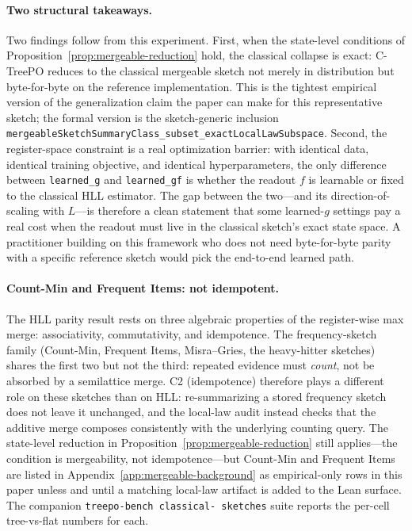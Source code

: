 \paragraph{Two structural takeaways.}
Two findings follow from this experiment. First, when the state-level
conditions of Proposition~\ref{prop:mergeable-reduction} hold, the
classical collapse is exact: C-TreePO reduces to the classical
mergeable sketch not merely in distribution but byte-for-byte on the
reference implementation. This is the tightest empirical version of
the generalization claim the paper can make for this representative
sketch; the formal version is the sketch-generic inclusion
\texttt{mergeableSketchSummaryClass\_subset\_exactLocalLawSubspace}.
Second, the register-space constraint is a real optimization barrier:
with identical data, identical training objective, and identical
hyperparameters, the only difference between \texttt{learned\_g} and
\texttt{learned\_gf} is whether the readout $f$ is learnable or fixed
to the classical HLL estimator. The gap between the two---and its
direction-of-scaling with $L$---is therefore a clean statement that
some learned-$g$ settings pay a real cost when the readout must live
in the classical sketch's exact state space. A practitioner building
on this framework who does not need byte-for-byte parity with a
specific reference sketch would pick the end-to-end learned path.

\paragraph{Count-Min and Frequent Items: not idempotent.}
The HLL parity result rests on three algebraic properties of the
register-wise max merge: associativity, commutativity, and
idempotence. The frequency-sketch family (Count-Min, Frequent Items,
Misra--Gries, the heavy-hitter sketches) shares the first two but
not the third: repeated evidence must \emph{count}, not be absorbed
by a semilattice merge. C2 (idempotence) therefore plays a different
role on these sketches than on HLL: re-summarizing a stored frequency
sketch does not leave it unchanged, and the local-law audit instead
checks that the additive merge composes consistently with the
underlying counting query. The state-level reduction in
Proposition~\ref{prop:mergeable-reduction} still applies---the
condition is mergeability, not idempotence---but Count-Min and
Frequent Items are listed in
Appendix~\ref{app:mergeable-background} as empirical-only rows in
this paper unless and until a matching local-law artifact is added
to the Lean surface. The companion \texttt{treepo-bench classical-
sketches} suite reports the per-cell tree-vs-flat numbers for each.

